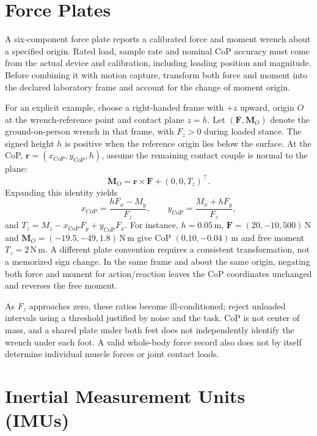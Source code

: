 \section{Force Plates}

A six-component force plate reports a calibrated force and moment wrench about a specified origin.
Rated load, sample rate and nominal CoP accuracy must come from the actual device and calibration, including loading position and magnitude.
Before combining it with motion capture, transform both force and moment into the declared laboratory frame and account for the change of moment origin.

For an explicit example, choose a right-handed frame with $+z$ upward, origin $O$ at the wrench-reference point and contact plane $z=h$.
Let $(\bm F,\bm M_O)$ denote the ground-on-person wrench in that frame, with $F_z>0$ during loaded stance.
The signed height $h$ is positive when the reference origin lies below the surface.
At the CoP, $\bm r=(x_{\mathrm{CoP}},y_{\mathrm{CoP}},h)$, assume the remaining contact couple is normal to the plane:
\[
\bm M_O=\bm r\times\bm F+(0,0,T_z)^\top.
\]
Expanding this identity yields
\begin{equation}
  x_{\mathrm{CoP}}=\frac{hF_x-M_y}{F_z},\qquad
  y_{\mathrm{CoP}}=\frac{M_x+hF_y}{F_z},
  \label{eq:ch7:cop}
\end{equation}
and $T_z=M_z-x_{\mathrm{CoP}}F_y+y_{\mathrm{CoP}}F_x$.
For instance, $h=0.05$\,m, $\bm F=(20,-10,500)$\,N and $\bm M_O=(-19.5,-49,1.8)$\,N\,m give CoP $(0.10,-0.04)$\,m and free moment $T_z=2$\,N\,m.
A different plate convention requires a consistent transformation, not a memorized sign change.
In the same frame and about the same origin, negating both force and moment for action/reaction leaves the CoP coordinates unchanged and reverses the free moment.

As $F_z$ approaches zero, these ratios become ill-conditioned; reject unloaded intervals using a threshold justified by noise and the task.
CoP is not center of mass, and a shared plate under both feet does not independently identify the wrench under each foot.
A valid whole-body force record also does not by itself determine individual muscle forces or joint contact loads.

\section{Inertial Measurement Units (IMUs)}

